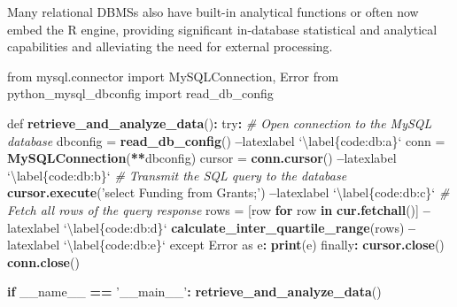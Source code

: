 \documentclass[]{krantz}
\newenvironment{Shaded}{\begin{snugshade}}{\end{snugshade}}
\newcommand{\KeywordTok}[1]{\textcolor[rgb]{0.13,0.29,0.53}{\textbf{#1}}}
\newcommand{\DataTypeTok}[1]{\textcolor[rgb]{0.13,0.29,0.53}{#1}}
\newcommand{\StringTok}[1]{\textcolor[rgb]{0.31,0.60,0.02}{#1}}
\newcommand{\CommentTok}[1]{\textcolor[rgb]{0.56,0.35,0.01}{\textit{#1}}}
\newcommand{\ControlFlowTok}[1]{\textcolor[rgb]{0.13,0.29,0.53}{\textbf{#1}}}
\newcommand{\OperatorTok}[1]{\textcolor[rgb]{0.81,0.36,0.00}{\textbf{#1}}}
\newcommand{\NormalTok}[1]{#1}
\begin{document}
Many relational DBMSs also have built-in analytical functions or often
now embed the R engine, providing significant in-database statistical
and analytical capabilities and alleviating the need for external
processing.

\begin{Shaded}
\begin{Highlighting}[]
\NormalTok{from mysql.connector import MySQLConnection, Error}
\NormalTok{from python_mysql_dbconfig import read_db_config}

\NormalTok{def }\KeywordTok{retrieve_and_analyze_data}\NormalTok{()}\OperatorTok{:}
\StringTok{    }\NormalTok{try}\OperatorTok{:}
\StringTok{        }\CommentTok{# Open connection to the MySQL database}
\StringTok{        }\NormalTok{dbconfig =}\StringTok{ }\KeywordTok{read_db_config}\NormalTok{() }\OperatorTok{--}\NormalTok{latexlabel }\StringTok{`}\DataTypeTok{\textbackslash{}label\{code:db:a\}}\StringTok{`}
\NormalTok{        conn =}\StringTok{ }\KeywordTok{MySQLConnection}\NormalTok{(}\OperatorTok{**}\NormalTok{dbconfig)}
\NormalTok{        cursor =}\StringTok{ }\KeywordTok{conn.cursor}\NormalTok{() }\OperatorTok{--}\NormalTok{latexlabel }\StringTok{`}\DataTypeTok{\textbackslash{}label\{code:db:b\}}\StringTok{`}
        \CommentTok{# Transmit the SQL query to the database}
        \KeywordTok{cursor.execute}\NormalTok{(}\StringTok{'select Funding from Grants;'}\NormalTok{) }\OperatorTok{--}\NormalTok{latexlabel }\StringTok{`}\DataTypeTok{\textbackslash{}label\{code:db:c\}}\StringTok{`}
        \CommentTok{# Fetch all rows of the query response}
\NormalTok{        rows =}\StringTok{ }\NormalTok{[row }\ControlFlowTok{for}\NormalTok{ row }\ControlFlowTok{in} \KeywordTok{cur.fetchall}\NormalTok{()] }\OperatorTok{--}\NormalTok{latexlabel }\StringTok{`}\DataTypeTok{\textbackslash{}label\{code:db:d\}}\StringTok{`}
        \KeywordTok{calculate_inter_quartile_range}\NormalTok{(rows) }\OperatorTok{--}\NormalTok{latexlabel }\StringTok{`}\DataTypeTok{\textbackslash{}label\{code:db:e\}}\StringTok{`}
\NormalTok{    except Error as e}\OperatorTok{:}
\StringTok{        }\KeywordTok{print}\NormalTok{(e)}
\NormalTok{    finally}\OperatorTok{:}
\StringTok{        }\KeywordTok{cursor.close}\NormalTok{()}
        \KeywordTok{conn.close}\NormalTok{()}

\ControlFlowTok{if}\NormalTok{ __name__ }\OperatorTok{==}\StringTok{ '__main__'}\OperatorTok{:}
\StringTok{    }\KeywordTok{retrieve_and_analyze_data}\NormalTok{()}
\end{Highlighting}
\end{Shaded}
\end{document}
